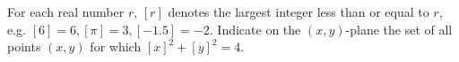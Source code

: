 For each real number $ r$,  $ [r]$ denotes the largest integer less than or equal to $ r$,  e.g. $ [6] = 6, [\pi] = 3, [-1.5] = -2$. Indicate on the $ (x,y)$-plane the set of all points $ (x,y)$ for which $ [x]^2 + [y]^2 = 4$.